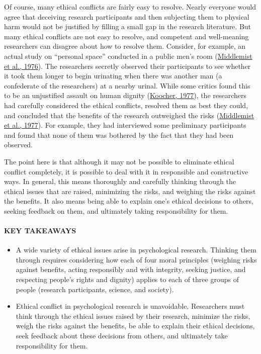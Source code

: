 \documentclass[
]{krantz}
\providecommand{\tightlist}{%
  \setlength{\itemsep}{0pt}\setlength{\parskip}{0pt}}
\begin{document}
Of course, many ethical conflicts are fairly easy to resolve. Nearly everyone would agree that deceiving research participants and then subjecting them to physical harm would not be justified by filling a small gap in the research literature. But many ethical conflicts are not easy to resolve, and competent and well-meaning researchers can disagree about how to resolve them. Consider, for example, an actual study on ``personal space'' conducted in a public men's room (\protect\hyperlink{ref-middlemist1976personal}{Middlemist et al., 1976}). The researchers secretly observed their participants to see whether it took them longer to begin urinating when there was another man (a confederate of the researchers) at a nearby urinal. While some critics found this to be an unjustified assault on human dignity (\protect\hyperlink{ref-koocher1977bathroom}{Koocher, 1977}), the researchers had carefully considered the ethical conflicts, resolved them as best they could, and concluded that the benefits of the research outweighed the risks (\protect\hyperlink{ref-middlemist1977and}{Middlemist et al., 1977}). For example, they had interviewed some preliminary participants and found that none of them was bothered by the fact that they had been observed.

The point here is that although it may not be possible to eliminate ethical conflict completely, it is possible to deal with it in responsible and constructive ways. In general, this means thoroughly and carefully thinking through the ethical issues that are raised, minimizing the risks, and weighing the risks against the benefits. It also means being able to explain one's ethical decisions to others, seeking feedback on them, and ultimately taking responsibility for them.

\hypertarget{key-takeaways-8}{%
\paragraph*{KEY TAKEAWAYS}\label{key-takeaways-8}}

\begin{itemize}
\tightlist
\item
  A wide variety of ethical issues arise in psychological research. Thinking them through requires considering how each of four moral principles (weighing risks against benefits, acting responsibly and with integrity, seeking justice, and respecting people's rights and dignity) applies to each of three groups of people (research participants, science, and society).
\item
  Ethical conflict in psychological research is unavoidable. Researchers must think through the ethical issues raised by their research, minimize the risks, weigh the risks against the benefits, be able to explain their ethical decisions, seek feedback about these decisions from others, and ultimately take responsibility for them.
\end{itemize}
\end{document}
